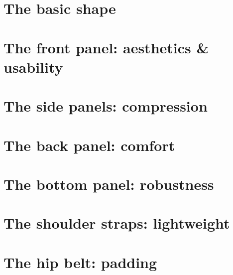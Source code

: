 

\section{The basic shape}


\section{The front panel: aesthetics \& usability}


\section{The side panels: compression}


\section{The back panel: comfort}


\section{The bottom panel: robustness}
\section{The shoulder straps: lightweight}
\section{The hip belt: padding}
